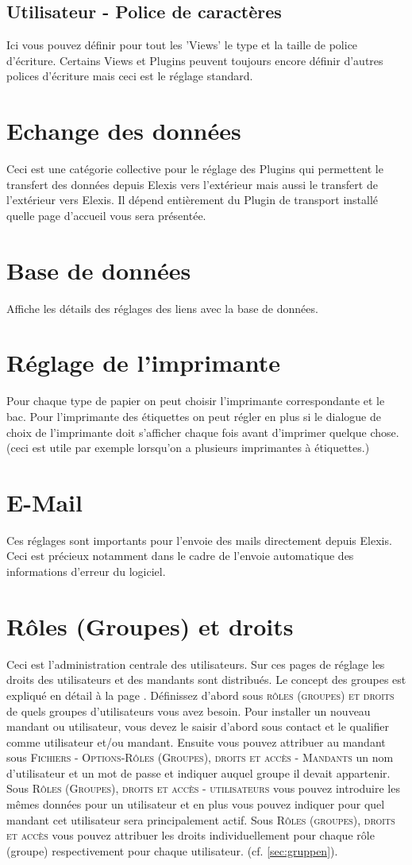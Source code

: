 \subsection{Utilisateur - Police de caractères}
Ici vous pouvez définir pour tout les 'Views' le type et la taille de police d'écriture. Certains Views et Plugins peuvent toujours encore définir d'autres polices d'écriture mais ceci est le réglage standard. 

\section{Echange des données}
Ceci est une catégorie collective pour le réglage des Plugins qui permettent le transfert des données depuis Elexis vers l'extérieur mais aussi le transfert de l'extérieur vers Elexis. Il dépend entièrement du Plugin de transport installé quelle page d'accueil vous sera présentée. 
\section{Base de données}
Affiche les détails des réglages des liens avec la base de données. 
\section{Réglage de l'imprimante}
Pour chaque type de papier on peut choisir l'imprimante correspondante et le bac. Pour l'imprimante des étiquettes on peut régler en plus si le dialogue de choix de l'imprimante doit s'afficher chaque fois avant d'imprimer quelque chose. (ceci est utile par exemple lorsqu'on a plusieurs imprimantes à étiquettes.)
\section{E-Mail}
Ces réglages sont importants pour l'envoie des mails directement depuis Elexis. Ceci est précieux notamment dans le cadre de l'envoie automatique des informations d'erreur du logiciel. 

\section{Rôles (Groupes) et droits}
Ceci est l'administration centrale des utilisateurs. Sur ces pages de réglage les droits des utilisateurs et des mandants sont distribués. Le concept des groupes est expliqué en détail à la page \pageref{sec:gruppen}.
Définissez d'abord sous  \textsc{rôles (groupes) et droits} de quels groupes d'utilisateurs vous avez besoin. Pour installer un nouveau mandant ou utilisateur, vous devez le saisir d'abord sous  \glqq contact \grqq{} et le qualifier comme utilisateur et/ou mandant. Ensuite vous pouvez attribuer au mandant sous \textsc{Fichiers - Options-Rôles (Groupes), droits et accès - Mandants} un nom d'utilisateur et un mot de passe et indiquer auquel groupe il devait appartenir. Sous \textsc{Rôles (Groupes), droits et accès - utilisateurs} vous pouvez introduire les mêmes données pour un utilisateur et en plus vous pouvez indiquer pour quel mandant cet utilisateur sera principalement actif. Sous \textsc{Rôles (groupes), droits et accès } vous pouvez attribuer les droits individuellement pour chaque rôle (groupe) respectivement pour chaque utilisateur.   (cf. \ref{sec:gruppen}).
